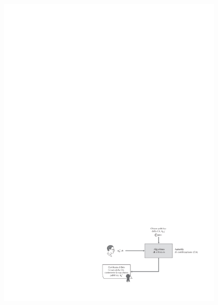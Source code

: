 \documentclass[a4paper]{article}
\begin{document}
	\begin{figure}[!htp]
		\centering
		\includegraphics[width=\textwidth]{img/int-aut_e_autor/autorita_di_certificazione.pdf}
	\end{figure}
	
\end{document}
